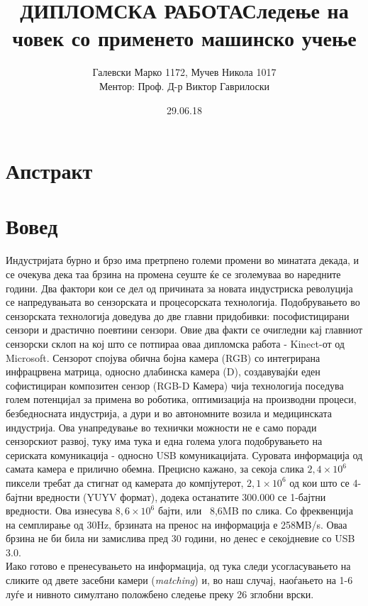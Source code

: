 \documentclass[12pt]{article}
\title{ДИПЛОМСКА РАБОТА\bigbreak \textbf{Следење на човек со применето машинско учење}}
\date{29.06.18}
\author{Галевски Марко 1172, Мучев Никола 1017	\\	Ментор: Проф. Д-р Виктор Гаврилоски}
\begin{document}
    \sloppy
    \maketitle{}
    \newpage
    \tableofcontents
    \newpage

\section*{Апстракт}

\section{Вовед}
  Индустријата бурно и брзо има претрпено големи промени во минатата декада, и се очекува дека таа брзина на промена сеуште ќе се зголемуваа во наредните години. Два фактори кои се дел од причината за новата индустриска револуција се напредувањата во сензорската и процесорската технологија.\bigbreak
  Подобрувањето во сензорската технологија доведува до две главни придобивки: пософистицирани сензори и драстично поевтини сензори. Овие два факти се очигледни кај главниот сензорски склоп на кој што се потпираа оваа дипломска работа - Kinect-от од Microsoft. Сензорот спојува обична бојна камера (RGB) со интегрирана инфрацрвена матрица, односно длабинска камера (D), создавувајќи еден софистициран композитен сензор (RGB-D Камера) чија технологија поседува голем потенцијал за примена во роботика, оптимизација на производни процеси, безбедносната индустрија, а дури и во автономните возила и медицинската индустрија.
  \bigbreak
  Ова унапредување во технички можности не е само поради сензорскиот развој, туку има тука и една голема улога подобрувањето на сериската комуникација - односно USB комуникацијата.
  Суровата информација од самата камера е прилично обемна. Прецисно кажано, за секоја слика $2,4 \times 10^6$ пиксели требат да стигнат од камерата до компјутерот, $2,1 \times 10^6$ од кои што се 4-бајтни вредности (YUYV формат), додека останатите 300.000 се 1-бајтни вредности. Ова изнесува $8,6 \times 10^6$ бајти, или ~8,6MB по слика. Со фреквенција на семплирање од 30Hz, брзината на пренос на информација е 258МB/s. Оваа брзина не би била ни замислива пред 30 години, но денес е секојдневие со USB 3.0.
  \\
  Иако готово е пренесувањето на информација, од тука следи усогласувањето на сликите од двете засебни камери (\textit{matching}) и, во наш случај, наоѓањето на 1-6 луѓе и нивното симултано положбено следење преку 26 зглобни врски.
\end{document}
